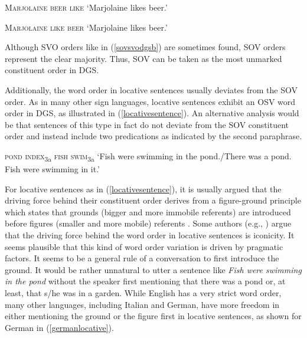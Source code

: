 \begin{exe}
\ex\label{sovsvodgsa}
\textsc{Marjolaine beer like}
\glt `Marjolaine likes beer.'\label{sovsvodgsaaba}
\end{exe}

\begin{exe}
\ex\label{sovsvodgsb}
\textsc{Marjolaine like beer}
\glt `Marjolaine likes beer.'
\end{exe}


\noindent Although SVO orders like in (\ref{sovsvodgsb}) are sometimes found, SOV orders represent the clear majority. Thus, SOV can be taken as the most unmarked constituent order in DGS.%

Additionally, the word order in locative sentences usually deviates from the SOV order. As in many other sign languages, locative sentences exhibit an OSV word order in DGS, as illustrated in (\ref{locativesentence}). An alternative analysis would be that sentences of this type in fact do not deviate from the SOV constituent order and instead include two predications as indicated by the second paraphrase. 

\begin{exe}
\ex \textsc{pond index}\textsubscript{3a} \textsc{fish swim}\textsubscript{3a}
\glt `Fish were swimming in the pond./There was a pond. Fish were swimming in it.' \label{locativesentence}
\end{exe}

\noindent For locative sentences as in (\ref{locativesentence}), it is usually argued that the driving force behind their constituent order derives from a figure-ground principle which states that grounds (bigger and more immobile referents) are introduced before figures (smaller and more mobile) referents \citep{volterra1984italian,kimmelman2012word,pfau2016simple}. Some authors (e.g., \citealt{perniss2007space, ozyurek2010locative}) argue that the driving force behind the word order in locative sentences is iconicity. It seems plausible that this kind of word order variation is driven by pragmatic factors. It seems to be a general rule of a conversation to first introduce the ground. It would be rather unnatural to utter a sentence like \textit{Fish were swimming in the pond} without the speaker first mentioning that there was a pond or, at least, that s/he was in a garden. While English has a very strict word order, many other languages, including Italian and German, have more freedom in either mentioning the ground or the figure first in locative sentences, as shown for German in (\ref{germanlocative}).

